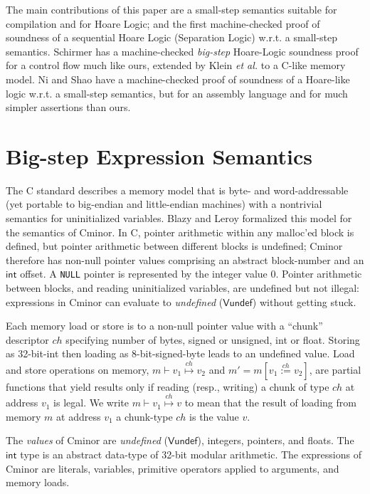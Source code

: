 \documentclass{llncs}
\newcommand{\cminor}{Cminor}
\newcommand{\tyface}[1]{\ensuremath{\mathsf{#1}}}
\newcommand{\loadv}[4]{#1\vdash #2\stackrel{#3}{\mapsto}#4}
\newcommand{\storev}[5]{#5=#2[#3\stackrel{#1}{:=}#4]}
\begin{document}
The main contributions of this paper are
a small-step semantics suitable for
compilation and for Hoare Logic; and
the first machine-checked proof of soundness of 
a sequential Hoare Logic (Separation Logic) w.r.t.
a small-step semantics.
Schirmer \cite{schirmer06:phd} has a machine-checked \emph{big-step}
Hoare-Logic soundness proof for a control flow much like ours,
extended by Klein \emph{et al.}  \cite{Klein:POPL07} to a
C-like memory model.
Ni and Shao \cite{Shao:popl06} have a machine-checked proof of soundness of a Hoare-like logic w.r.t.
a small-step semantics, but for an assembly language and for much simpler assertions
than ours.

\section{Big-step Expression Semantics}\label{big-step}

The C standard \cite{ansi88c} describes a memory model
that is byte- and word-addressable
(yet portable to big-endian and little-endian machines)
with a nontrivial semantics
for uninitialized variables.
Blazy and Leroy formalized this model
\cite{blazy05:icfem} for the semantics of \cminor.
In C, pointer
arithmetic within any 
malloc'ed block is defined, but pointer arithmetic between different
blocks is undefined; \cminor{} therefore has non-null pointer values
comprising an abstract block-number and an \tyface{int} offset.
A \texttt{NULL} pointer is represented by the integer value $0$.
Pointer arithmetic between blocks, and
reading uninitialized variables, are undefined but not 
illegal: expressions in \cminor{} can evaluate to
\emph{undefined} (\tyface{Vundef}) without getting stuck.  

Each memory load or store is to a non-null
pointer value 
with a ``chunk'' descriptor
$\mathit{ch}$
specifying number of bytes,
signed or unsigned, int or float.
Storing as 32-bit-int then loading as 8-bit-signed-byte
leads to an undefined value.
Load and store operations on memory,
$\loadv{m}{v_1}{\mathit{ch}}{v_2}$ and 
$\storev{\mathit{ch}}{m}{v_1}{v_2}{m'}$,
are partial functions that yield results 
only if reading (resp., writing)
a chunk of type $\mathit{ch}$ at address $v_1$ is legal.
We write $\loadv{m}{v_1}{\mathit{ch}}{v}$ to mean
that the result of loading from memory $m$ at address $v_1$
a chunk-type $\mathit{ch}$ is the value $v$.

The \emph{values} of \cminor{} are \emph{undefined} (\tyface{Vundef}),
integers, pointers, and floats.  The \tyface{int} type
is an abstract data-type of 32-bit modular arithmetic.
The expressions of \cminor{} are literals, variables,
primitive operators applied to arguments,
and memory loads. 
\end{document}
